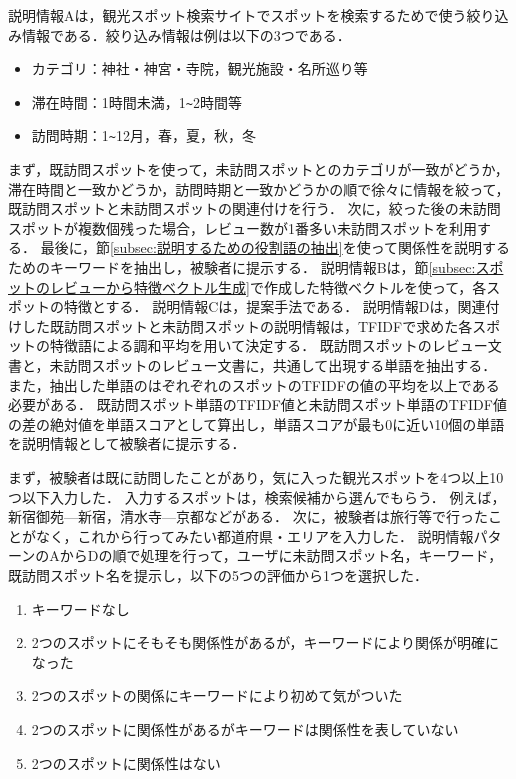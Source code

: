 \documentclass{deimj}
\begin{document}
説明情報Aは，観光スポット検索サイトでスポットを検索するためで使う絞り込み情報である．絞り込み情報は例は以下の3つである．
\begin{itemize}
 \item カテゴリ：神社・神宮・寺院，観光施設・名所巡り等
 \item 滞在時間：1時間未満，1\verb|~|2時間等
 \item 訪問時期：1\verb|~|12月，春，夏，秋，冬
\end{itemize}

まず，既訪問スポットを使って，未訪問スポットとのカテゴリが一致がどうか，滞在時間と一致かどうか，訪問時期と一致かどうかの順で徐々に情報を絞って，既訪問スポットと未訪問スポットの関連付けを行う．
次に，絞った後の未訪問スポットが複数個残った場合，レビュー数が1番多い未訪問スポットを利用する．
最後に，節\ref{subsec:説明するための役割語の抽出}を使って関係性を説明するためのキーワードを抽出し，被験者に提示する．
説明情報Bは，節\ref{subsec:スポットのレビューから特徴ベクトル生成}で作成した特徴ベクトルを使って，各スポットの特徴とする．
説明情報Cは，提案手法である．
説明情報Dは，関連付けした既訪問スポットと未訪問スポットの説明情報は，TFIDFで求めた各スポットの特徴語による調和平均を用いて決定する．
既訪問スポットのレビュー文書と，未訪問スポットのレビュー文書に，共通して出現する単語を抽出する．
また，抽出した単語のはぞれぞれのスポットのTFIDFの値の平均を以上である必要がある．
既訪問スポット単語のTFIDF値と未訪問スポット単語のTFIDF値の差の絶対値を単語スコアとして算出し，単語スコアが最も0に近い10個の単語を説明情報として被験者に提示する．

まず，被験者は既に訪問したことがあり，気に入った観光スポットを4つ以上10つ以下入力した．
入力するスポットは，検索候補から選んでもらう．
例えば，新宿御苑---新宿，清水寺---京都などがある．
次に，被験者は旅行等で行ったことがなく，これから行ってみたい都道府県・エリアを入力した．
説明情報パターンのAからDの順で処理を行って，ユーザに未訪問スポット名，キーワード，既訪問スポット名を提示し，以下の5つの評価から1つを選択した．
\begin{enumerate}
  \item キーワードなし
  \item 2つのスポットにそもそも関係性があるが，キーワードにより関係が明確になった
  \item 2つのスポットの関係にキーワードにより初めて気がついた
  \item 2つのスポットに関係性があるがキーワードは関係性を表していない
  \item 2つのスポットに関係性はない
\end{enumerate}
\end{document}

